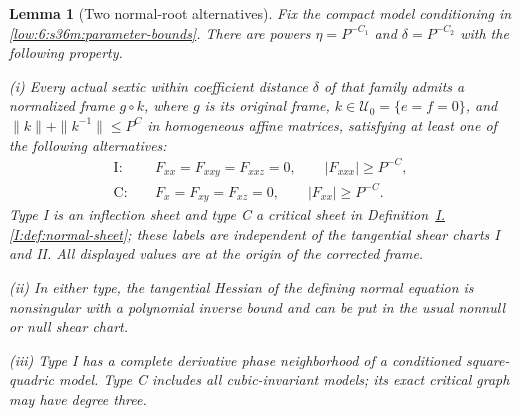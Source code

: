 \documentclass[11pt]{amsart}
\newtheorem{lemma}[theorem]{Lemma}
\theoremstyle{definition}
\theoremstyle{remark}
\numberwithin{equation}{section}
\newcommand{\partIref}[1]{\hyperref[I:#1]{I.\ref*{I:#1}}}
\begin{document}
\begin{lemma}[Two normal-root alternatives]\label{low:6:s36a:two-types}
Fix the compact model conditioning in \eqref{low:6:s36m:parameter-bounds}. There are powers $\eta=P^{-C_1}$ and $\delta=P^{-C_2}$ with the following property.

\noindent\textup{(i)} Every actual sextic within coefficient distance $\delta$ of that family admits a normalized frame $g\circ k$, where $g$ is its original frame, $k\in\mathcal U_0=\{e=f=0\}$, and $\|k\|+\|k^{-1}\|\le P^C$ in homogeneous affine matrices, satisfying at least one of the following alternatives:
\begin{align*}
\mathrm I:&\quad F_{xx}=F_{xxy}=F_{xxz}=0,\qquad |F_{xxx}|\ge P^{-C},\\
\mathrm C:&\quad F_x=F_{xy}=F_{xz}=0,\qquad |F_{xx}|\ge P^{-C}.
\end{align*}
Type I is an inflection sheet and type C a critical sheet in Definition~\partIref{def:normal-sheet}; these labels are independent of the tangential shear charts I and II. All displayed values are at the origin of the corrected frame.

\noindent\textup{(ii)} In either type, the tangential Hessian of the defining normal equation is nonsingular with a polynomial inverse bound and can be put in the usual nonnull or null shear chart.

\noindent\textup{(iii)} Type I has a complete derivative phase neighborhood of a conditioned square-quadric model. Type C includes all cubic-invariant models; its exact critical graph may have degree three.
\end{lemma}
\end{document}
